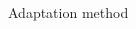 \documentclass[pdf,dvipsnames,aspectratio=169]{beamer}
\begin{document}
\begin{frame}[c]{Adaptation method}
\begin{columns}[t]
\begin{column}{0.45\textwidth}
\begin{figure}
            \end{figure}
        \end{column}
    \end{columns}
\end{frame}
\end{document}
